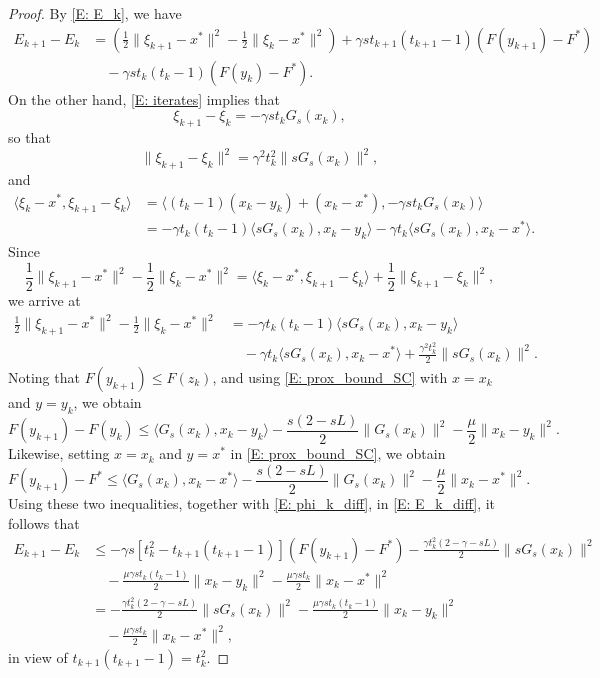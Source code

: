 \documentclass[pdflatex,sn-mathphys-num]{sn-jnl}
\theoremstyle{thmstyleone}
\theoremstyle{thmstyletwo}
\theoremstyle{thmstylethree}
\begin{document}
\begin{proof}
By \eqref{E: E_k}, we have
\begin{equation}\label{E: E_k_diff}
\begin{aligned}
E_{k+1} - E_k
&= \left( \frac{1}{2}\| \xi_{k+1} - x^* \|^2 - \frac{1}{2}\| \xi_k - x^* \|^2 \right)
 + \gamma s t_{k+1} (t_{k+1}-1) \left( F(y_{k+1}) - F^* \right) \\
&\quad - \gamma s t_k(t_k-1) \left( F(y_k) - F^* \right).
\end{aligned}
\end{equation}
On the other hand, \eqref{E: iterates} implies that
$$\xi_{k+1} - \xi_k = -\gamma s t_k G_s(x_k),$$
so that
$$ \| \xi_{k+1} - \xi_k \|^2 = \gamma^2 t_k^2 \| s G_s(x_k) \|^2, $$
and
\begin{align*}
\langle \xi_k-x^*, \xi_{k+1} - \xi_k \rangle 
&= \langle (t_k-1)(x_k-y_k) + (x_k-x^*), -\gamma s t_k G_s(x_k) \rangle\\
&= - \gamma t_k (t_k-1) \langle sG_s(x_k), x_k-y_k \rangle 
 - \gamma t_k \langle s G_s(x_k), x_k-x^* \rangle.  
\end{align*}
Since
$$\frac{1}{2}\| \xi_{k+1} - x^* \|^2 - \frac{1}{2}\| \xi_k - x^* \|^2 = \langle \xi_k - x^*, \xi_{k+1} - \xi_k \rangle + \frac{1}{2}\| \xi_{k+1} - \xi_k \|^2,$$
we arrive at
\begin{equation}\label{E: phi_k_diff}
\begin{aligned}
\frac{1}{2}\| \xi_{k+1} - x^* \|^2 - \frac{1}{2}\| \xi_k - x^* \|^2 
&= - \gamma t_k (t_k-1) \langle sG_s(x_k), x_k-y_k \rangle \\ 
&\quad - \gamma t_k \langle s G_s(x_k), x_k-x^* \rangle
   + \frac{\gamma^2 t_k^2}{2}\| sG_s(x_k) \|^2.
\end{aligned}
\end{equation}
Noting that $F(y_{k+1}) \le F(z_k)$, and using \eqref{E: prox_bound_SC} with $x=x_k$ and $y=y_k$, we obtain
$$ F(y_{k+1}) - F(y_k) 
\le \langle G_s(x_k), x_k - y_k \rangle 
  - \frac{s(2-sL)}{2}\| G_s(x_k) \|^2  
  - \frac{\mu}{2}\|x_k-y_k \|^2. $$
Likewise, setting $x=x_k$ and $y=x^*$ in \eqref{E: prox_bound_SC}, we obtain
\begin{equation}\label{E:DeltaE_1}
F(y_{k+1}) - F^*
\le \langle G_s(x_k), x_k-x^* \rangle    
    - \frac{s(2-sL)}{2}\| G_s(x_k) \|^2
    - \frac{\mu}{2}\|x_k-x^* \|^2.
\end{equation}
Using these two inequalities, together with \eqref{E: phi_k_diff}, in \eqref{E: E_k_diff}, it follows that
\begin{align*}
E_{k+1} - E_k  
&\le - \gamma s\left[ t_k^2 - t_{k+1}(t_{k+1}-1) \right] \left( F(y_{k+1}) - F^* \right) 
  - \frac{\gamma t_k^2(2-\gamma-sL)}{2}\| sG_s(x_k) \|^2 \\  
&\quad - \frac{\mu \gamma s t_k(t_k-1)}{2}\|x_k-y_k \|^2
  - \frac{\mu\gamma s t_k}{2}\|x_k-x^* \|^2 \\
&= - \frac{\gamma t_k^2(2-\gamma-sL)}{2}\| sG_s(x_k) \|^2
   - \frac{\mu \gamma s t_k(t_k-1)}{2} \|x_k-y_k \|^2 \\
&\quad - \frac{\mu\gamma s t_k}{2}\|x_k-x^* \|^2,
\end{align*}
in view of $t_{k+1}(t_{k+1}-1)=t_k^2$.
\end{proof}
\end{document}
